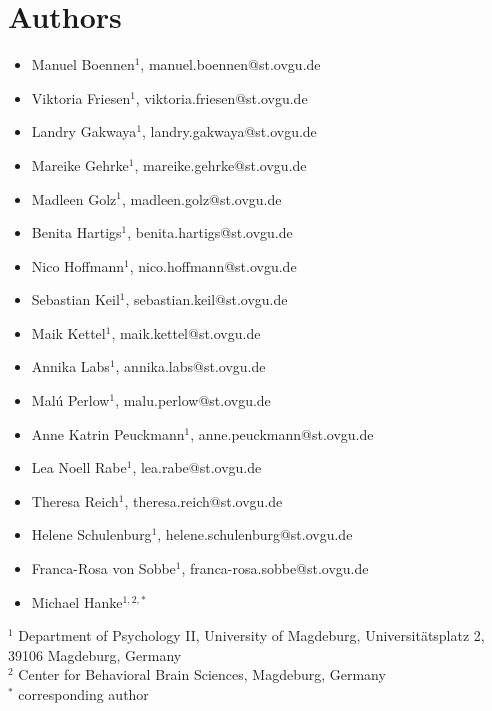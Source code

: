 \section*{Authors}

\begin{itemize}
\item Manuel Boennen$^{1}$, manuel.boennen@st.ovgu.de
\item Viktoria Friesen$^{1}$, viktoria.friesen@st.ovgu.de
\item Landry Gakwaya$^{1}$, landry.gakwaya@st.ovgu.de
\item Mareike Gehrke$^{1}$, mareike.gehrke@st.ovgu.de
\item Madleen Golz$^{1}$, madleen.golz@st.ovgu.de
\item Benita Hartigs$^{1}$, benita.hartigs@st.ovgu.de
\item Nico Hoffmann$^{1}$, nico.hoffmann@st.ovgu.de
\item Sebastian Keil$^{1}$, sebastian.keil@st.ovgu.de
\item Maik Kettel$^{1}$, maik.kettel@st.ovgu.de
\item Annika Labs$^{1}$, annika.labs@st.ovgu.de
\item Malú Perlow$^{1}$, malu.perlow@st.ovgu.de
\item Anne Katrin Peuckmann$^{1}$, anne.peuckmann@st.ovgu.de
\item Lea Noell Rabe$^{1}$, lea.rabe@st.ovgu.de
\item Theresa Reich$^{1}$, theresa.reich@st.ovgu.de
\item Helene Schulenburg$^{1}$, helene.schulenburg@st.ovgu.de
\item Franca-Rosa von Sobbe$^{1}$, franca-rosa.sobbe@st.ovgu.de
\item Michael Hanke$^{1,2,*}$
\end{itemize}

$^{1}$ Department of Psychology II, University of Magdeburg, Universitätsplatz 2, 39106 Magdeburg, Germany\\
$^{2}$ Center for Behavioral Brain Sciences, Magdeburg, Germany\\
$^{*}$ corresponding author